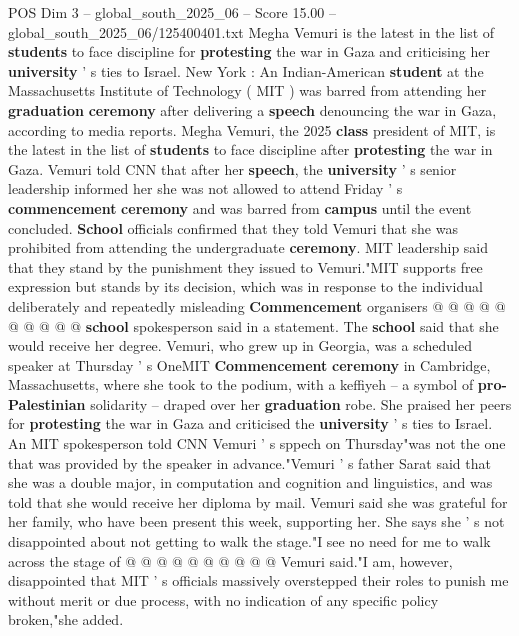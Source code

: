\begin{textsample}{POS Dim 3 – global\_south\_2025\_06 – Score 15.00 – global\_south\_2025\_06/125400401.txt}  \label{ex:f3_pos_196}
Megha Vemuri is the latest in the list of \textbf{students} to face discipline for \textbf{protesting} the war in Gaza and criticising her \textbf{university} ' s ties to Israel.
New York : An Indian-American \textbf{student} at the Massachusetts Institute of Technology ( MIT ) was barred from attending her \textbf{graduation} \textbf{ceremony} after delivering a \textbf{speech} denouncing the war in Gaza, according to media reports.
Megha Vemuri, the 2025 \textbf{class} president of MIT, is the latest in the list of \textbf{students} to face discipline after \textbf{protesting} the war in Gaza.
Vemuri told CNN that after her \textbf{speech}, the \textbf{university} ' s senior leadership informed her she was not allowed to attend Friday ' s \textbf{commencement} \textbf{ceremony} and was barred from \textbf{campus} until the event concluded. \textbf{School} officials confirmed that they told Vemuri that she was prohibited from attending the undergraduate \textbf{ceremony}.
MIT leadership said that they stand by the punishment they issued to Vemuri."MIT supports free expression but stands by its decision, which was in response to the individual deliberately and repeatedly misleading \textbf{Commencement} organisers @ @ @ @ @ @ @ @ @ @ \textbf{school} spokesperson said in a statement.
The \textbf{school} said that she would receive her degree.
Vemuri, who grew up in Georgia, was a scheduled speaker at Thursday ' s OneMIT \textbf{Commencement} \textbf{ceremony} in Cambridge, Massachusetts, where she took to the podium, with a keffiyeh -- a symbol of \textbf{pro-Palestinian} solidarity -- draped over her \textbf{graduation} robe.
She praised her peers for \textbf{protesting} the war in Gaza and criticised the \textbf{university} ' s ties to Israel.
An MIT spokesperson told CNN Vemuri ' s sppech on Thursday"was not the one that was provided by the speaker in advance."Vemuri ' s father Sarat said that she was a double major, in computation and cognition and linguistics, and was told that she would receive her diploma by mail.
Vemuri said she was grateful for her family, who have been present this week, supporting her.
She says she ' s not disappointed about not getting to walk the stage."I see no need for me to walk across the stage of @ @ @ @ @ @ @ @ @ @ Vemuri said."I am, however, disappointed that MIT ' s officials massively overstepped their roles to punish me without merit or due process, with no indication of any specific policy broken,"she added.

\end{textsample}
